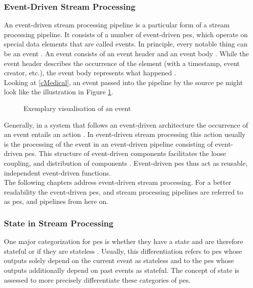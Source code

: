 \subsubsection{Event-Driven Stream Processing}
\label{lEventDrivenStreamProcessing}

An event-driven stream processing pipeline is a particular form of a stream processing pipeline. It consists of a number of event-driven \gls{pe}s, which operate on special data elements that are called events. In principle, every notable thing can be an event \cite{Michelson.2006}. An event consists of an event header and an event body \cite{Michelson.2006}. While the event header describes the occurrence of the element (with a timestamp, event creator, etc.), the event body represents what happened \cite{Michelson.2006}.\\
Looking at \ref{cMedical}, an event passed into the pipeline by the source \gls{pe} might look like the illustration in Figure \ref{fMedicalEvent}.\par

\begin{figure}[H]
    \centering
    \graphicspath{{./figures/code/}}

\caption{Exemplary visualisation of an event}
\label{fMedicalEvent}
\end{figure}

Generally, in a system that follows an event-driven architecture the occurrence of an event entails an action \cite{Michelson.2006}. In event-driven stream processing this action usually is the processing of the event in an event-driven pipeline consisting of event-driven \gls{pe}s. This structure of event-driven components facilitates the loose coupling, and distribution of components \cite{Michelson.2006}. Event-driven \gls{pe}s thus act as reusable, independent event-driven functions.\\
The following chapters address event-driven stream processing. For a better readability the event-driven \gls{pe}s, and stream processing pipelines are referred to as \gls{pe}s, and pipelines from here on.


\subsubsection{State in Stream Processing}
\label{lStateStreamProcessing}

One major categorization for \gls{pe}s is whether they have a state and are therefore stateful or if they are stateless \cite{CastroFernandez.2013}. Usually, this differentiation refers to \gls{pe}s whose outputs solely depend on the current event as stateless and to the \gls{pe}s whose outputs additionally depend on past events as stateful. The concept of state is assessed to more precisely differentiate these categories of \gls{pe}s.\par

